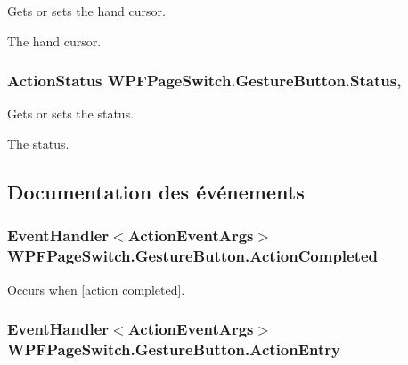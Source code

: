 Gets or sets the hand cursor. 

The hand cursor. \hypertarget{class_w_p_f_page_switch_1_1_gesture_button_a5477f8cb4541609e9f01c8578b36628e}{
\subsubsection[{Status}]{\setlength{\rightskip}{0pt plus 5cm}Action\+Status W\+P\+F\+Page\+Switch.\+Gesture\+Button.\+Status\hspace{0.3cm}{\ttfamily [get]}, {\ttfamily [set]}}}\label{class_w_p_f_page_switch_1_1_gesture_button_a5477f8cb4541609e9f01c8578b36628e}


Gets or sets the status. 

The status. 

\subsection{Documentation des événements}
\hypertarget{class_w_p_f_page_switch_1_1_gesture_button_aaa1d04a339798df542c6c22ecf31b703}{
\subsubsection[{Action\+Completed}]{\setlength{\rightskip}{0pt plus 5cm}Event\+Handler$<${\bf Action\+Event\+Args}$>$ W\+P\+F\+Page\+Switch.\+Gesture\+Button.\+Action\+Completed}}\label{class_w_p_f_page_switch_1_1_gesture_button_aaa1d04a339798df542c6c22ecf31b703}


Occurs when \mbox{[}action completed\mbox{]}. 

\hypertarget{class_w_p_f_page_switch_1_1_gesture_button_a5a3bd97a0f3065ecb51612ce2e73ee01}{
\subsubsection[{Action\+Entry}]{\setlength{\rightskip}{0pt plus 5cm}Event\+Handler$<${\bf Action\+Event\+Args}$>$ W\+P\+F\+Page\+Switch.\+Gesture\+Button.\+Action\+Entry}}\label{class_w_p_f_page_switch_1_1_gesture_button_a5a3bd97a0f3065ecb51612ce2e73ee01}


